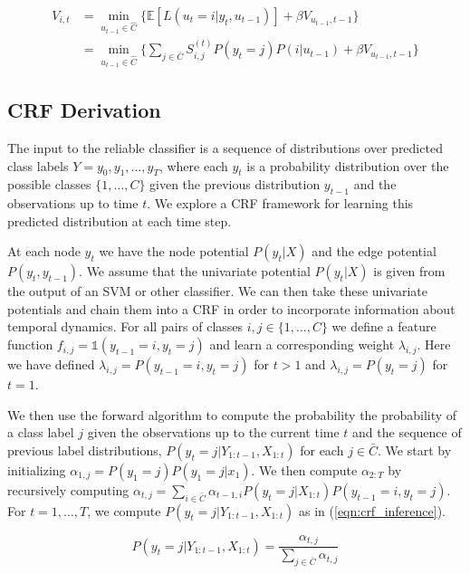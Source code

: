 \documentclass[12pt,solutions]{article}
\newcommand{\E}{\mathbb{E}}
\begin{document}
\begin{align}
V_{i,t} &= \min_{u_{t-1} \in \hat{C}} \big\{ \E[L(u_t=i|y_t, u_{t-1})] + \beta V_{u_{t-1},t-1}\big\}\\
&=  \min_{u_{t-1} \in \hat{C}} \big\{  \sum_{j \in \bar{C}} S_{i,j}^{(t)} P(y_t=j)P(i|u_{t-1}) + \beta V_{u_{t-1},t-1}\big\}
 \label{eqn:dp_step2}
\end{align}




\subsection{CRF Derivation}

The input to the reliable classifier is a sequence of distributions over predicted class labels $Y = y_0, y_1, \ldots, y_T$, where each $y_t$ is a probability distribution over the possible classes $\{1,\ldots,C\}$ given the previous distribution $y_{t-1}$ and the observations up to time $t$. We explore a CRF framework for learning this predicted distribution at each time step.

At each node $y_t$ we have the node potential $P(y_t|X)$ and the edge potential $P(y_t, y_{t-1})$. We assume that the univariate potential $P(y_t|X)$ is given from the output of an SVM or other classifier. We can then take these univariate potentials and chain them into a CRF in order to incorporate information about temporal dynamics. For all pairs of classes $i,j \in \{1,\ldots,C\}$ we define a feature function $f_{i,j} = \mathbb{1}(y_{t-1}=i, y_{t}=j)$ and learn a corresponding weight $\lambda_{i,j}$. Here we have defined $\lambda_{i,j} = P(y_{t-1} = i,y_t=j)$ for $t >1$ and $\lambda_{i,j} = P(y_t=j)$ for $t =1$.

We then use the forward algorithm to compute the probability the probability of a class label $j$ given the observations up to the current time $t$ and the sequence of previous label distributions, $P(y_t =j| Y_{1:t-1}, X_{1:t}) $ for each $j \in \bar{C}$. We start by initializing $\alpha_{1,j} = P(y_1=j)P(y_1=j|x_1)$. We then compute $\alpha_{2:T}$ by recursively computing $\alpha_{t,j} = \sum_{i \in \bar{C}}\alpha_{t-1,i}P(y_t=j|X_{1:t})P(y_{t-1} = i,y_t=j)$. For $t=1,\ldots, T$, we compute $P(y_t =j| Y_{1:t-1}, X_{1:t}) $ as in (\ref{eqn:crf_inference}).

\begin{equation}
P(y_t=j | Y_{1:t-1}, X_{1:t}) = \frac{\alpha_{t,j}}{\sum_{j \in \bar{C}}\alpha_{t,j}} \label{eqn:crf_inference}
\end{equation}
 
\end{document}
